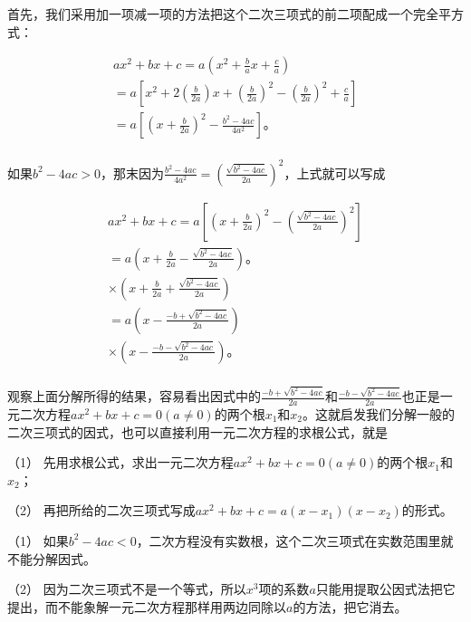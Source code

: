 首先，我们采用加一项减一项的方法把这个二次三项式的前二项配成一个完全平方式：

\[
\begin{array}{l} a x ^ {2} + b x + c = a \left(x ^ {2} + \frac{b}{a} x + \frac{c}{a}\right) \\ = a \left[ x ^ {2} + 2 \left(\frac{b}{2 a}\right) x + \left(\frac{b}{2 a}\right) ^ {2} - \left(\frac{b}{2 a}\right) ^ {2} + \frac{c}{a} \right] \\ = a \left[ \left(x + \frac{b}{2 a}\right) ^ {2} - \frac{b ^ {2} - 4 a c}{4 a ^ {2}} \right]\text{。} \\ \end{array}
\]

如果\(b^{2} - 4ac > 0\)，那末因为\(\frac{b^2 - 4ac}{4a^2} = \left(\frac{\sqrt{b^2 - 4ac}}{2a}\right)^2\)，上式就可以写成

\[
\begin{array}{l} a x ^ {2} + b x + c = a \left[ \left(x + \frac{b}{2 a}\right) ^ {2} - \left(\frac{\sqrt {b ^ {2} - 4 a c}}{2 a}\right) ^ {2} \right] \\ = a \left(x + \frac{b}{2 a} - \frac{\sqrt {b ^ {2} - 4 a c}}{2 a}\right)\text{。} \\ \times \left(x + \frac{b}{2 a} + \frac{\sqrt {b ^ {2} - 4 a c}}{2 a}\right) \\ = a \left(x - \frac{- b + \sqrt {b ^ {2} - 4 a c}}{2 a}\right) \\ \times \left(x - \frac{- b - \sqrt {b ^ {2} - 4 a c}}{2 a}\right)\text{。} \\ \end{array}
\]

观察上面分解所得的结果，容易看出因式中的\(\frac{-b+\sqrt{b^{2}-4ac}}{2a}\)和\(\frac{-b-\sqrt{b^{2}-4ac}}{2a}\)也正是一元二次方程\(ax^{2}+bx+c=0(a\neq0)\)的两个根\(x_{1}\)和\(x_{2}\)。这就启发我们分解一般的二次三项式的因式，也可以直接利用一元二次方程的求根公式，就是

（1）
先用求根公式，求出一元二次方程\(ax^2 + bx + c = 0 (a \neq 0)\)的两个根\(x_1\)和\(x_2\)；

（2）
再把所给的二次三项式写成\(ax^2 + bx + c = a(x - x_1)(x - x_2)\)的形式。


（1）
如果\(b^2 - 4ac < 0\)，二次方程没有实数根，这个二次三项式在实数范围里就不能分解因式。

（2）
因为二次三项式不是一个等式，所以\(x^{3}\)项的系数\(a\)只能用提取公因式法把它提出，而不能象解一元二次方程那样用两边同除以\(a\)的方法，把它消去。

